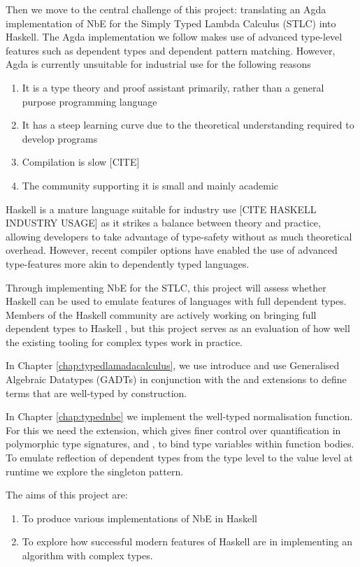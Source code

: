 Then we move to the central challenge of this project: translating an Agda implementation of NbE for the Simply Typed Lambda Calculus (STLC) into Haskell. The Agda implementation we follow makes use of advanced type-level features such as dependent types and dependent pattern matching. However, Agda is currently unsuitable for industrial use for the following reasons

\begin{enumerate}
    \item It is a type theory and proof assistant primarily, rather than a general purpose programming language
    \item It has a steep learning curve due to the theoretical understanding required to develop programs
    \item Compilation is slow [CITE]
    \item The community supporting it is small and mainly academic
\end{enumerate}

Haskell is a mature language suitable for industry use [CITE HASKELL INDUSTRY USAGE] as it strikes a balance between theory and practice, allowing developers to take advantage of type-safety without as much theoretical overhead. However, recent compiler options have enabled the use of advanced type-features more akin to dependently typed languages. 

Through implementing NbE for the STLC, this project will assess whether Haskell can be used to emulate features of languages with full dependent types. Members of the Haskell community are actively working on bringing full dependent types to Haskell \cite{DH}, but this project serves as an evaluation of how well the existing tooling for complex types work in practice.

In Chapter \ref{chap:typedlamadacalculus}, we use introduce and use Generalised Algebraic Datatypes (GADTs) in conjunction with the  and  extensions to define terms that are well-typed by construction. 

In Chapter \ref{chap:typednbe} we implement the well-typed normalisation function. For this we need the  extension, which gives finer control over quantification in polymorphic type signatures, and , to bind type variables within function bodies. To emulate reflection of dependent types from the type level to the value level at runtime we explore the singleton pattern.

The aims of this project are:
\begin{enumerate}
    \item To produce various implementations of NbE in Haskell
    \item To explore how successful modern features of Haskell are in implementing an algorithm with complex types.
\end{enumerate}